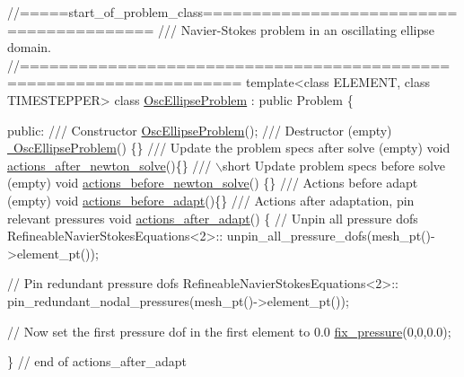 \begin{DoxyCodeInclude}
\textcolor{comment}{//=====start\_of\_problem\_class=========================================}
\textcolor{comment}{/// Navier-Stokes problem in an oscillating ellipse domain.}
\textcolor{comment}{}\textcolor{comment}{//====================================================================}
\textcolor{keyword}{template}<\textcolor{keyword}{class} ELEMENT, \textcolor{keyword}{class} TIMESTEPPER>
\textcolor{keyword}{class }\hyperlink{classOscEllipseProblem}{OscEllipseProblem} : \textcolor{keyword}{public} Problem
\{

\textcolor{keyword}{public}:
\textcolor{comment}{}
\textcolor{comment}{ /// Constructor}
\textcolor{comment}{} \hyperlink{classOscEllipseProblem_aaa836937ec963921243fcb990f6fe538}{OscEllipseProblem}();
\textcolor{comment}{}
\textcolor{comment}{ /// Destructor (empty)}
\textcolor{comment}{} \hyperlink{classOscEllipseProblem_a48a38acb7db1b394f7bfcd02e779b795}{~OscEllipseProblem}() \{\}
\textcolor{comment}{}
\textcolor{comment}{ /// Update the problem specs after solve (empty)}
\textcolor{comment}{} \textcolor{keywordtype}{void} \hyperlink{classOscEllipseProblem_a268e14b24e3ac922e7362bbb37ccde1f}{actions\_after\_newton\_solve}()\{\}
\textcolor{comment}{}
\textcolor{comment}{ /// \(\backslash\)short Update problem specs before solve (empty)}
\textcolor{comment}{} \textcolor{keywordtype}{void} \hyperlink{classOscEllipseProblem_a18bbd70aa8c140637637053a5f839c11}{actions\_before\_newton\_solve}() \{\} 
 \textcolor{comment}{}
\textcolor{comment}{ /// Actions before adapt (empty)}
\textcolor{comment}{} \textcolor{keywordtype}{void} \hyperlink{classOscEllipseProblem_a97c1b0056acbb9a6ec6157b6e7ad258a}{actions\_before\_adapt}()\{\}
\textcolor{comment}{}
\textcolor{comment}{ /// Actions after adaptation, pin relevant pressures}
\textcolor{comment}{} \textcolor{keywordtype}{void} \hyperlink{classOscEllipseProblem_a6044661f75986848484df2c04bfe7aab}{actions\_after\_adapt}()
  \{
   \textcolor{comment}{// Unpin all pressure dofs}
   RefineableNavierStokesEquations<2>::
    unpin\_all\_pressure\_dofs(mesh\_pt()->element\_pt());

   \textcolor{comment}{// Pin redundant pressure dofs}
   RefineableNavierStokesEquations<2>::
    pin\_redundant\_nodal\_pressures(mesh\_pt()->element\_pt());
   
   \textcolor{comment}{// Now set the first pressure dof in the first element to 0.0}
   \hyperlink{classOscEllipseProblem_a8b70831d1c25a40c814d5d92e77a1085}{fix\_pressure}(0,0,0.0);

  \} \textcolor{comment}{// end of actions\_after\_adapt}

\end{DoxyCodeInclude}


